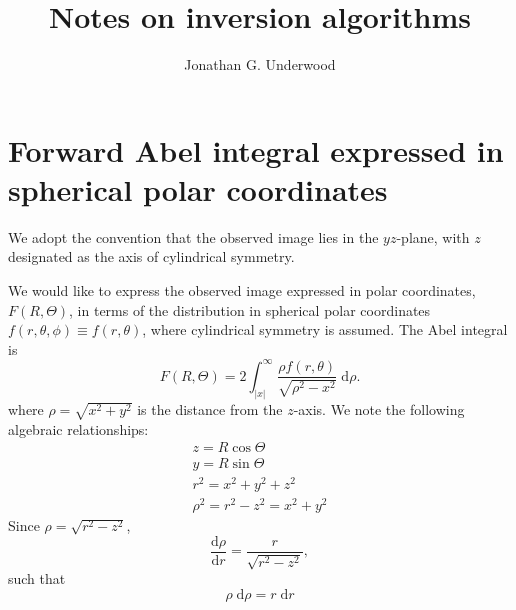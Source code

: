 \documentclass{article}
\title{Notes on inversion algorithms}
\author {Jonathan G. Underwood}
\begin{document}
\section{Forward Abel integral expressed in spherical polar coordinates} 
We adopt the convention that the observed image lies in the $yz$-plane, with
$z$ designated as the axis of cylindrical symmetry.

We would like to express the observed image expressed in polar coordinates,
$F(R, \Theta)$, in terms of the distribution in spherical polar coordinates
$f(r, \theta, \phi)\equiv f(r, \theta)$, where cylindrical symmetry is
assumed. The Abel integral is
\begin{equation}
  \label{eq:1}
  F(R, \Theta)=2\int_{|x|}^\infty
  \frac{\rho f(r, \theta)}{\sqrt{\rho^2-x^2}}\;\mathrm{d}\rho.
\end{equation}
where $\rho=\sqrt{x^2+y^2}$ is the distance from the $z$-axis. We note the
following algebraic relationships:
\begin{gather}
  z=R\cos\Theta\\
  y=R\sin\Theta\\
  r^2=x^2+y^2+z^2\\
  \rho^2=r^2-z^2=x^2+y^2
\end{gather}
Since $\rho=\sqrt{r^2-z^2}$,
\begin{equation}
  \label{eq:2}
  \frac{\mathrm{d}\rho}{\mathrm{d}r}=
  \frac{r}{\sqrt{r^2-z^2}},
\end{equation}
such that
\begin{equation}
  \label{eq:3}
  \rho\;\mathrm{d}\rho=r\;\mathrm{d}r
\end{equation}
\end{document}
